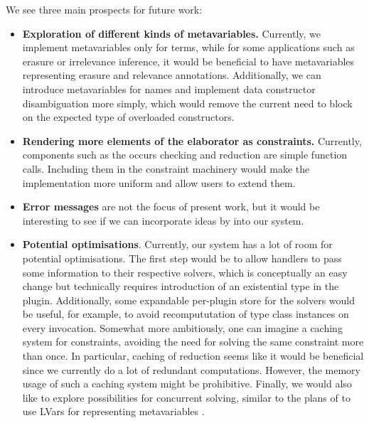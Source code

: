 We see three main prospects for future work:

\begin{itemize}
\tightlist
\item
  \textbf{Exploration of different kinds of metavariables.} Currently,
  we implement metavariables only for terms, while for some applications
  such as erasure \citep{tejiscakDependentlyTypedCalculus2020} or
  irrelevance inference, it would be beneficial to have metavariables
  representing erasure and relevance annotations. Additionally, we can
  introduce metavariables for names and implement data constructor
  disambiguation more simply, which would remove the current need to
  block on the expected type of overloaded constructors.
\item
  \textbf{Rendering more elements of the elaborator as constraints.}
  Currently, components such as the occurs checking and reduction are
  simple function calls. Including them in the constraint machinery
  would make the implementation more uniform and allow users to extend
  them.
\item
  \textbf{Error messages} are not the focus of present work, but it
  would be interesting to see if we can incorporate ideas by
  \citet{heerenScriptingTypeInference2003} into our system.
\item
  \textbf{Potential optimisations}. Currently, our system has a lot of
  room for potential optimisations. The first step would be to allow
  handlers to pass some information to their respective solvers, which
  is conceptually an easy change but technically requires introduction
  of an existential type in the plugin. Additionally, some expandable
  per-plugin store for the solvers would be useful, for example, to
  avoid recompututation of type class instances on every invocation.
  Somewhat more ambitiously, one can imagine a caching system for
  constraints, avoiding the need for solving the same constraint more
  than once. In particular, caching of reduction seems like it would be
  beneficial since we currently do a lot of redundant computations.
  However, the memory usage of such a caching system might be
  prohibitive. Finally, we would also like to explore possibilities for
  concurrent solving, similar to the plans of
  \citet{allaisTypOSOperatingSystem2022a} to use LVars for representing
  metavariables \citep{kuperLatticebasedDataStructures2015}.
\end{itemize}

\hypertarget{refs}{}
\begin{CSLReferences}{0}{0}
\end{CSLReferences}